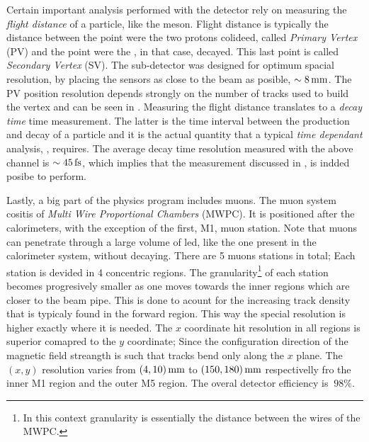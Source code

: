 Certain important analysis performed with the \lhcb detector rely on measuring the {\it flight distance} of a particle, like the \Bs meson.
Flight distance is typically the distance between the point were the two protons colideed, called {\it Primary Vertex} (PV)
and the point were the \Bs, in that case, decayed. This last point is called {\it Secondary Vertex} (SV). The \velo sub-detector
was designed for optimum spacial resolution, by placing the \velo sensors as close to the beam as posible, $\sim 8 \rm \,mm$.
The PV position resolution depends strongly on the number of tracks used to build the vertex and can be seen in .
Measuring the flight distance translates to a {\it decay time} time measurement. The latter is the time interval between
the production and decay of a particle and it is the actual quantity that a typical {\it time dependant} analysis,
\eg \BsJpsiPhi, requires. The average decay time resolution measured with the above channel is $\sim 45\rm \,fs$, which
implies that the \phis measurement discussed in , is indded posibe to perform.

Lastly, a big part of the \lhcb physics program includes muons. The muon system cositis of {\it Multi Wire Proportional Chambers}
(MWPC). It is positioned after the calorimeters, with the exception of the first, M1, muon station.
Note that muons can penetrate through a large volume of led, like the one present in the calorimeter system,
without decaying. There are 5 muons stations in total; Each station is devided in 4 concentric regions.
The granularity\footnote{In this context granularity is essentially the distance between the wires of the MWPC.}
of each station becomes progresively smaller as one moves towards the inner regions which are closer to the beam pipe.
This is done to acount for the increasing track density that is typicaly found in the forward region. This way
the special resolution is higher exactly where it is needed. The $x$ coordinate hit resolution in all regions
is superior comapred to the $y$ coordinate; Since the configuration direction of the \lhcb magnetic field streangth
is such that tracks bend only along the $x$ plane. The $(x,y)$ resolution varies from $(4,10)\rm \,mm$ to $(150,180)\rm \,mm$
respectivelly fro the inner M1 region and the outer M5 region. The overal detector efficiency is $\>98\%$.
